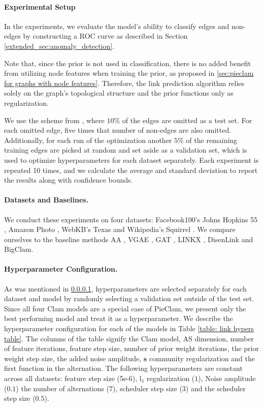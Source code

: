 \documentclass[letterpaper]{article} %
\begin{document}
\paragraph{Experimental Setup}
\label{sec: link experimental setup}
In the experiments, we evaluate the model’s ability to classify edges and non-edges by constructing a ROC curve as described in Section \ref{extended_sec:anomaly_detection}.

Note that, since the prior is not used in classification, there is no added benefit from utilizing node features when training the prior, as proposed in \ref{sec:pieclam for graphs with node features}. Therefore, the link prediction algorithm relies solely on the graph’s topological structure and the prior functions only as regularization.

We use the scheme from \cite{zhou2022disenlink}, where $10\%$ of the edges are omitted as a test set. For each omitted edge, five times that number of non-edges are also omitted. Additionally, for each run of the optimization another $5\%$ of the remaining training edges are picked at random and set aside as a validation set, which is used to optimize hyperparameters for each dataset separately. Each experiment is repeated 10 times, and we calculate the average and standard deviation to report the results along with confidence bounds.

\paragraph{Datasets and Baselines.}
We conduct these experiments on four datasets: Facebook100’s Johns Hopkins 55 \cite{lim2021hopkins}, Amazon Photo \cite{shchur2018photo}, WebKB’s Texas and Wikipedia’s Squirrel \cite{pei2020texasquirrel}. We compare ourselves to the baseline methods AA \cite{adamic2003friends}, VGAE \cite{kipf2016variational}, GAT \cite{GAT}, LINKX \cite{lim2021linkx}, DisenLink \cite{zhou2022disenlink} and BigClam.


\paragraph{Hyperparameter Configuration.}
As was mentioned in \ref{sec: link experimental setup}, hyperparameters are selected separately for each dataset and model by randomly selecting a validation set outside of the test set. Since all four Clam models are a special case of PieClam, we present only the best performing model and treat it as a hyperparameter. We describe the hyperparameter configuration for each of the models in Table \ref{table: link hypers table}. The columns of the table signify the Clam model, AS dimension, number of feature iterations, feature step size, number of prior weight iterations, the prior weight step size, the added noise amplitude, $\mathbf{s}$ community regularization and the first function in the alternation. The following hyperparameters are constant across all datasets: feature step size (5e-6), l$_1$ regularization ($1$), Noise amplitude ($0.1$) the number of alternations ($7$), scheduler step size ($3$) and the scheduler step size ($0.5$).
\end{document}
